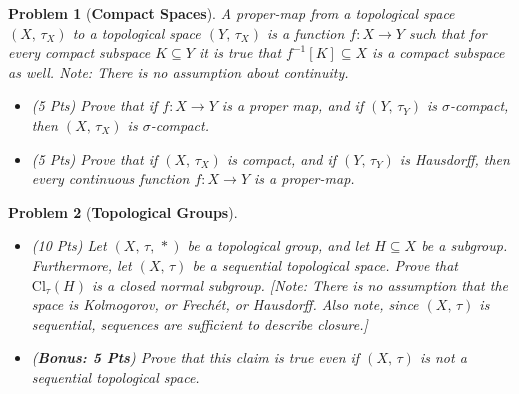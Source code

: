 \documentclass{article}
\theoremstyle{normal}
\newtheorem{problem}{Problem}
\begin{document}
    \begin{problem}[\textbf{Compact Spaces}]
        A \textit{proper-map} from a topological space $(X,\,\tau_{X})$ to a
        topological space $(Y,\,\tau_{X})$ is a function
        $f:X\rightarrow{Y}$ such that for every compact subspace
        $K\subseteq{Y}$ it is true that $f^{-1}[K]\subseteq{X}$ is a compact
        subspace as well. Note: There is no assumption about continuity.
        \begin{itemize}
            \item (5 Pts) Prove that if $f:X\rightarrow{Y}$ is a proper map,
                and if $(Y,\,\tau_{Y})$ is $\sigma$-compact, then
                $(X,\,\tau_{X})$ is $\sigma$-compact.
            \item (5 Pts) Prove that if $(X,\,\tau_{X})$ is compact, and if
                $(Y,\,\tau_{Y})$ is Hausdorff, then every continuous function
                $f:X\rightarrow{Y}$ is a proper-map.
        \end{itemize}
    \end{problem}
    \begin{problem}[\textbf{Topological Groups}]
        \par\hfill\par
        \begin{itemize}
            \item (10 Pts) Let $(X,\,\tau,\,*)$ be a topological group, and let
                $H\subseteq{X}$ be a subgroup. Furthermore, let
                $(X,\,\tau)$ be a sequential topological space. Prove that
                $\textrm{Cl}_{\tau}(H)$ is a closed normal subgroup.
                [Note: There is no assumption that the space is Kolmogorov, or
                Frech\'{e}t, or Hausdorff. Also note, since $(X,\,\tau)$ is
                sequential, sequences are sufficient to describe closure.]
            \item (\textbf{Bonus: 5 Pts}) Prove that this claim is true even
                if $(X,\,\tau)$ is not a sequential topological space.
        \end{itemize}
    \end{problem}
\end{document}
